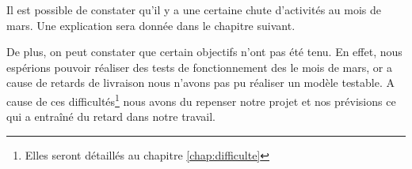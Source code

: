 Il est possible de constater qu'il y a une certaine chute d'activités au mois de mars. Une explication sera donnée dans le chapitre suivant.

De plus, on peut constater que certain objectifs n'ont pas été tenu. En effet, nous espérions pouvoir réaliser des tests de fonctionnement des le mois de mars, or a cause de retards de livraison nous n'avons pas pu réaliser un modèle testable. A cause de ces difficultés\footnote{Elles seront détaillés au chapitre \ref{chap:difficulte}} nous avons du repenser notre projet et nos prévisions ce qui a entraîné du retard dans notre travail.


